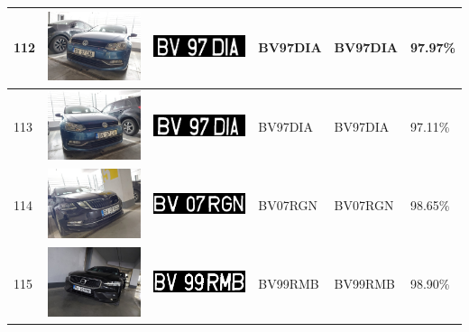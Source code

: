 \documentclass[a4paper,12pt]{report}
\begin{document}
\begin{longtable}{| m{0.6cm} | m{3cm} | m{3cm} | m{1.8cm} | m{1.8cm} | m{1.8cm} |}
    112 & \includegraphics[width=3cm,keepaspectratio]{dataset/65_d1.jpg}  & \includegraphics[width=3cm,keepaspectratio]{segmentari/112.jpg} & BV97DIA             & BV97DIA              & 97.97\%    \\ \hline
    113 & \includegraphics[width=3cm,keepaspectratio]{dataset/65_s1.jpg}  & \includegraphics[width=3cm,keepaspectratio]{segmentari/113.jpg} & BV97DIA             & BV97DIA              & 97.11\%    \\ \hline
    114 & \includegraphics[width=3cm,keepaspectratio]{dataset/66_s1.jpg}  & \includegraphics[width=3cm,keepaspectratio]{segmentari/114.jpg} & BV07RGN             & BV07RGN              & 98.65\%    \\ \hline
    115 & \includegraphics[width=3cm,keepaspectratio]{dataset/67_d1.jpg}  & \includegraphics[width=3cm,keepaspectratio]{segmentari/115.jpg} & BV99RMB             & BV99RMB              & 98.90\%    \\ \hline

\end{longtable}
\end{document}
